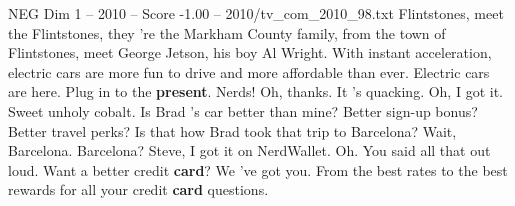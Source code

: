 \begin{textsample}{NEG Dim 1 – 2010 – Score -1.00 – 2010/tv\_com\_2010\_98.txt}  \label{ex:f1_neg_034}
Flintstones, meet the Flintstones, they 're the Markham County family, from the town of Flintstones, meet George Jetson, his boy Al Wright.
With instant acceleration, electric cars are more fun to drive and more affordable than ever.
Electric cars are here.
Plug in to the \textbf{present}.
Nerds!
Oh, thanks.
It 's quacking.
Oh, I got it.
Sweet unholy cobalt.
Is Brad 's car better than mine?
Better sign-up bonus?
Better travel perks?
Is that how Brad took that trip to Barcelona?
Wait, Barcelona.
Barcelona?
Steve, I got it on NerdWallet.
Oh.
You said all that out loud.
Want a better credit \textbf{card}?
We 've got you.
From the best rates to the best rewards for all your credit \textbf{card} questions.

\end{textsample}
